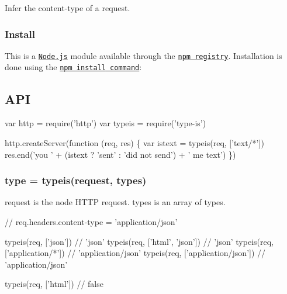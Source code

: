 \href{https://npmjs.org/package/type-is}{\tt } \href{https://npmjs.org/package/type-is}{\tt } \href{https://nodejs.org/en/download/}{\tt } \href{https://travis-ci.org/jshttp/type-is}{\tt } \href{https://coveralls.io/r/jshttp/type-is?branch=master}{\tt }

Infer the content-\/type of a request.

\subsubsection*{Install}

This is a \href{https://nodejs.org/en/}{\tt Node.\+js} module available through the \href{https://www.npmjs.com/}{\tt npm registry}. Installation is done using the \href{https://docs.npmjs.com/getting-started/installing-npm-packages-locally}{\tt {\ttfamily npm install} command}\+:




\subsection*{A\+PI}


\begin{DoxyCode}
var http = require('http')
var typeis = require('type-is')

http.createServer(function (req, res) \{
  var istext = typeis(req, ['text/*'])
  res.end('you ' + (istext ? 'sent' : 'did not send') + ' me text')
\})
\end{DoxyCode}


\subsubsection*{type = typeis(request, types)}

{\ttfamily request} is the node H\+T\+TP request. {\ttfamily types} is an array of types.


\begin{DoxyCode}
// req.headers.content-type = 'application/json'

typeis(req, ['json'])             // 'json'
typeis(req, ['html', 'json'])     // 'json'
typeis(req, ['application/*'])    // 'application/json'
typeis(req, ['application/json']) // 'application/json'

typeis(req, ['html']) // false
\end{DoxyCode}


